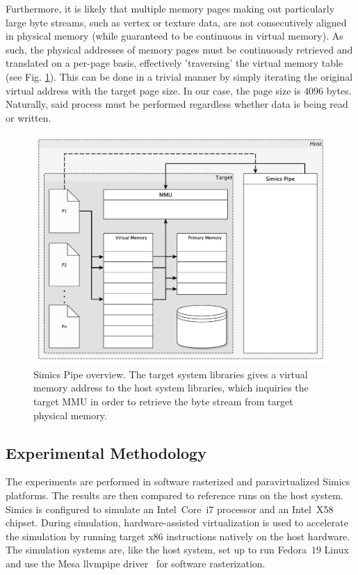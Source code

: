 Furthermore, it is likely that multiple memory pages making out particularly large byte streams, such as vertex or texture data, are not consecutively aligned in physical memory (while guaranteed to be continuous in virtual memory).
As such, the physical addresses of memory pages must be continuously retrieved and translated on a per-page basis, effectively 'traversing' the virtual memory table (see Fig. \ref{fig:virtualmemory}).
This can be done in a trivial manner by simply iterating the original virtual address with the target page size.
In our case, the page size is $4096$ bytes.
Naturally, said process must be performed regardless whether data is being read or written.

\begin{figure}
\centering
\includegraphics[width=\linewidth]{img/yedvirtualmemory.pdf}
\caption{Simics Pipe overview. The target system libraries gives a virtual memory address to the host system libraries, which inquiries the target MMU in order to retrieve the byte stream from target physical memory.}
\label{fig:virtualmemory}
\end{figure}

\subsection{Experimental Methodology}
\label{sec:experimentalmethodology}
The experiments are performed in software rasterized and paravirtualized Simics platforms.
The results are then compared to reference runs on the host system.
Simics is configured to simulate an Intel\circledR ~Core\texttrademark ~i7 processor and an Intel\circledR ~X58 chipset.
During simulation, hardware-assisted virtualization is used to accelerate the simulation by running target x86 instructions natively on the host hardware.
The simulation systems are, like the host system, set up to run Fedora~$19$ Linux and use the Mesa llvmpipe driver~ for software rasterization.

